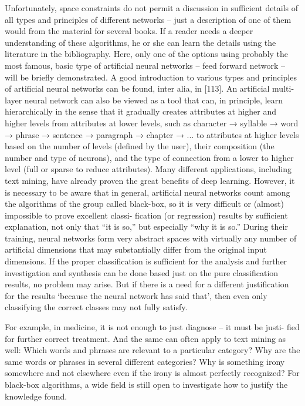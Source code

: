 \documentclass[11pt,openany,executivepaper]{book}
\begin{document}
Unfortunately, space constraints do not permit a discussion in sufficient details of all types and principles of different networks – just a description of one
of them would from the material for several books. If a reader needs a deeper
understanding of these algorithms, he or she can learn the details using the literature in the bibliography. Here, only one of the options using probably the most
famous, basic type of artificial neural networks – feed forward network – will
be briefly demonstrated. A good introduction to various types and principles of
artificial neural networks can be found, inter alia, in [113].
An artificial multi-layer neural network can also be viewed as a tool that can,
in principle, learn hierarchically in the sense that it gradually creates attributes
at higher and higher levels from attributes at lower levels, such as character →
syllable → word → phrase → sentence → paragraph → chapter → ... to attributes at higher levels based on the number of levels (defined by the user), their
composition (the number and type of neurons), and the type of connection from
a lower to higher level (full or sparse to reduce attributes).
Many different applications, including text mining, have already proven the
great benefits of deep learning. However, it is necessary to be aware that in general, artificial neural networks count among the algorithms of the group called
black-box, so it is very difficult or (almost) impossible to prove excellent classi-
fication (or regression) results by sufficient explanation, not only that “it is so,”
but especially “why it is so.”
During their training, neural networks form very abstract spaces with virtually any number of artificial dimensions that may substantially differ from the
original input dimensions. If the proper classification is sufficient for the analysis and further investigation and synthesis can be done based just on the pure
classification results, no problem may arise. But if there is a need for a different
justification for the results ‘because the neural network has said that’, then even
only classifying the correct classes may not fully satisfy.

For example, in medicine, it is not enough to just diagnose – it must be justi-
fied for further correct treatment. And the same can often apply to text mining as
well: Which words and phrases are relevant to a particular category? Why are the
same words or phrases in several different categories? Why is something irony
somewhere and not elsewhere even if the irony is almost perfectly recognized?
For black-box algorithms, a wide field is still open to investigate how to justify
the knowledge found.
\end{document}
